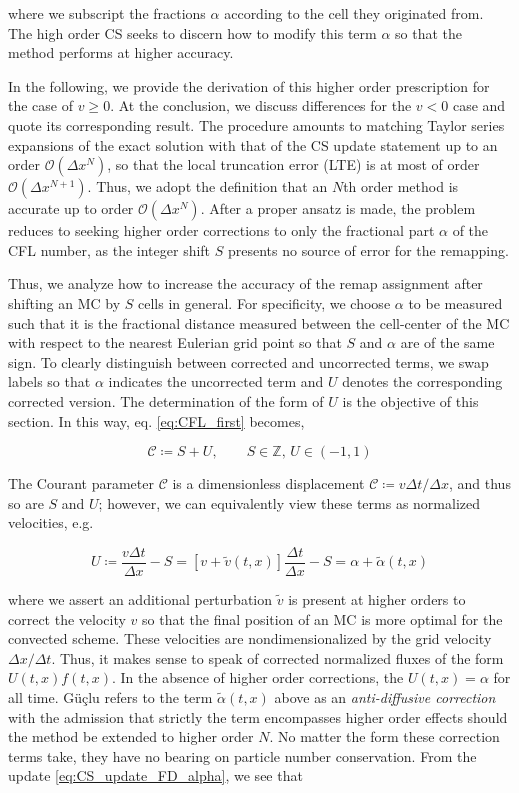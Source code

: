 \documentclass[11pt,titlepage]{report}
\begin{document}
\noindent where we subscript the fractions $\alpha$ according to the cell they originated from. The high order CS seeks to discern how to modify this term $\alpha$ so that the method performs at higher accuracy.

In the following, we provide the derivation of this higher order prescription for the case of $v \geq 0$. At the conclusion, we discuss differences for the  $v < 0$ case and quote its corresponding result. The procedure amounts to matching Taylor series expansions of the exact solution with that of the CS update statement up to an order $\mathcal{O}(\Delta x^N)$, so that the local truncation error (LTE) is at most of order $\mathcal{O}(\Delta x^{N+1})$. Thus, we adopt the definition that an $N$th order method is accurate up to order $\mathcal{O}(\Delta x^N)$. After a proper ansatz is made, the problem reduces to seeking higher order corrections to only the fractional part $\alpha$ of the CFL number, as the integer shift $S$ presents no source of error for the remapping.

Thus, we analyze how to increase the accuracy of the remap assignment after shifting an MC by $S$ cells in general. For specificity, we choose $\alpha$ to be measured such that it is the fractional distance measured between the cell-center of the MC with respect to the nearest Eulerian grid point so that $S$ and $\alpha$ are of the same sign. To clearly distinguish between corrected and uncorrected terms, we swap labels so that $\alpha$ indicates the uncorrected term and $U$ denotes the corresponding corrected version. The determination of the form of $U$ is the objective of this section. In this way, eq. \eqref{eq:CFL_first} becomes,

$$\mathcal{C} \coloneqq S + U, \qquad S\in\mathbb{Z},\, U\in (-1,1)$$

\noindent The Courant parameter $\mathcal{C}$ is a dimensionless displacement $\mathcal{C} \coloneqq v\Delta t / \Delta x$, and thus so are $S$ and $U$; however, we can equivalently view these terms as normalized velocities, e.g.

$$U \coloneqq \frac{v\Delta t}{\Delta x} - S = [v + \tilde{v} (t,x)]\frac{\Delta t}{\Delta x} - S = \alpha + \tilde{\alpha}(t,x)$$

\noindent where we assert an additional perturbation $\tilde{v}$ is present at higher orders to correct the velocity $v$ so that the final position of an MC is more optimal for the convected scheme. These velocities are nondimensionalized by the grid velocity $\Delta x / \Delta t$. Thus, it makes sense to speak of corrected normalized fluxes of the form $U(t,x)f(t,x)$. In the absence of higher order corrections, the  $U(t,x) = \alpha$ for all time. G\"{u}\c{c}lu refers to the term  $\tilde{\alpha}(t,x)$ above as an \emph{anti-diffusive correction} with the admission that strictly the term encompasses higher order effects should the method be extended to higher order $N$. No matter the form these correction terms take, they have no bearing on particle number conservation. From the update \eqref{eq:CS_update_FD_alpha}, we see that
\end{document}
